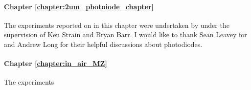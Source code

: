 \paragraph{Chapter \ref{chapter:2um_photoiode_chapter}}
The experiments reported on in this chapter were undertaken by under the supervision of Ken Strain and Bryan Barr. I would like to thank Sean Leavey for and Andrew Long for their helpful discussions about photodiodes.
\paragraph{Chapter \ref{chapter:in_air_MZ}}
The experiments 